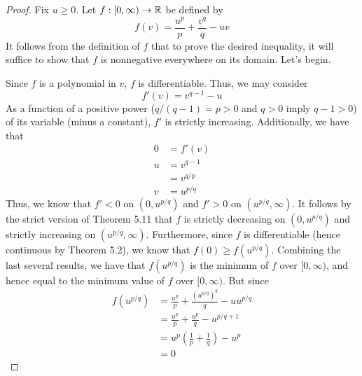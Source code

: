 \documentclass[../psets.tex]{subfiles}
\begin{document}
\begin{enumerate}[label={\textbf{\arabic*.}}]
\begin{enumerate}
\begin{proof}
            


            Fix $u\geq 0$. Let $f:[0,\infty)\to\mathbb{R}$ be defined by
            \begin{equation*}
                f(v) = \frac{u^p}{p}+\frac{v^q}{q}-uv
            \end{equation*}
            It follows from the definition of $f$ that to prove the desired inequality, it will suffice to show that $f$ is nonnegative everywhere on its domain. Let's begin.\par
            Since $f$ is a polynomial in $v$, $f$ is differentiable. Thus, we may consider
            \begin{equation*}
                f'(v) = v^{q-1}-u
            \end{equation*}
            As a function of a positive power ($q/(q-1)=p>0$ and $q>0$ imply $q-1>0$) of its variable (minus a constant), $f'$ is strictly increasing. Additionally, we have that
            \begin{align*}
                0 &= f'(v)\\
                u &= v^{q-1}\\
                &= v^{q/p}\\
                v &= u^{p/q}
            \end{align*}
            Thus, we know that $f'<0$ on $(0,u^{p/q})$ and $f'>0$ on $(u^{p/q},\infty)$. It follows by the strict version of Theorem 5.11 that $f$ is strictly decreasing on $(0,u^{p/q})$ and strictly increasing on $(u^{p/q},\infty)$. Furthermore, since $f$ is differentiable (hence continuous by Theorem 5.2), we know that $f(0)\geq f(u^{p/q})$. Combining the last several results, we have that $f(u^{p/q})$ is the minimum of $f$ over $[0,\infty)$, and hence equal to the minimum value of $f$ over $[0,\infty)$. But since
            \begin{align*}
                f(u^{p/q}) &= \frac{u^p}{p}+\frac{(u^{p/q})^q}{q}-uu^{p/q}\\
                &= \frac{u^p}{p}+\frac{u^p}{q}-u^{p/q+1}\\
                &= u^p\left( \frac{1}{p}+\frac{1}{q} \right)-u^p\\
                &= 0
            \end{align*}

\end{proof}
\end{enumerate}
\end{enumerate}
\end{document}
